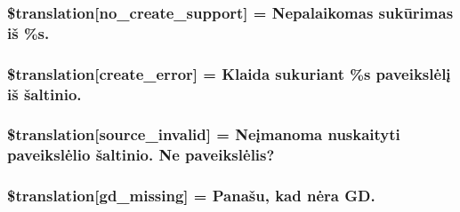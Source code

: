 \subsubsection[{\$translation}]{\setlength{\rightskip}{0pt plus 5cm}\$translation\mbox{[}\textquotesingle{}no\+\_\+create\+\_\+support\textquotesingle{}\mbox{]} = \textquotesingle{}Nepalaikomas sukūrimas iš \%s.\textquotesingle{}}\label{class_8upload_8lt___l_t_8php_a346dfd1ade29f583dd20d345c436859f}
\hypertarget{class_8upload_8lt___l_t_8php_a53013ce9255c4e1849098ddd9fdb2b3f}{}
\subsubsection[{\$translation}]{\setlength{\rightskip}{0pt plus 5cm}\$translation\mbox{[}\textquotesingle{}create\+\_\+error\textquotesingle{}\mbox{]} = \textquotesingle{}Klaida sukuriant \%s paveikslėlį iš šaltinio.\textquotesingle{}}\label{class_8upload_8lt___l_t_8php_a53013ce9255c4e1849098ddd9fdb2b3f}
\hypertarget{class_8upload_8lt___l_t_8php_a6ab0a660b457eaf2d3434b225449fdd6}{}
\subsubsection[{\$translation}]{\setlength{\rightskip}{0pt plus 5cm}\$translation\mbox{[}\textquotesingle{}source\+\_\+invalid\textquotesingle{}\mbox{]} = \textquotesingle{}Neįmanoma nuskaityti paveikslėlio šaltinio. Ne paveikslėlis?\textquotesingle{}}\label{class_8upload_8lt___l_t_8php_a6ab0a660b457eaf2d3434b225449fdd6}
\hypertarget{class_8upload_8lt___l_t_8php_a7f3dfcc0db4bbc0f2e7210c439798e56}{}
\subsubsection[{\$translation}]{\setlength{\rightskip}{0pt plus 5cm}\$translation\mbox{[}\textquotesingle{}gd\+\_\+missing\textquotesingle{}\mbox{]} = \textquotesingle{}Panašu, kad nėra G\+D.\textquotesingle{}}\label{class_8upload_8lt___l_t_8php_a7f3dfcc0db4bbc0f2e7210c439798e56}
\hypertarget{class_8upload_8lt___l_t_8php_a82d5853430ab72dc1f9799ec36144cc6}{}
